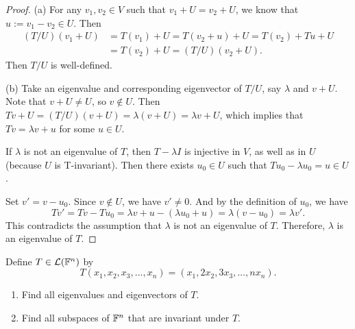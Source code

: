 \documentclass{article}
\begin{document}
\begin{proof}
  (a) For any \( v_1,v_2\in V \) such that \( v_1+U=v_2+U \), we know that \( u:=v_1-v_2\in U \). Then
  \begin{align*}
    (T/U)(v_1+U) &=T(v_1)+U = T(v_2+u)+U = T(v_2)+Tu+U\\
    &= T(v_2)+U = (T/U)(v_2+U).
  \end{align*}
  Then \( T/U \) is well-defined.\par
  (b) Take an eigenvalue and corresponding eigenvector of \( T/U \), say \( \lambda \) and \( v+U \). Note that \( v+U \neq U \), so \( v \notin U \). Then \( Tv+U=(T/U)(v+U)=\lambda(v+U)=\lambda v+U \), which implies that \( Tv=\lambda v+u \) for some \( u\in U \). \par
  If \( \lambda \) is not an eigenvalue of \( T \), then \( T-\lambda I \) is injective in \( V \), as well as in \( U \) (because \( U \) is T-invariant). Then there exists \( u_0\in U \) such that \( Tu_0-\lambda u_0=u\in U \). \par
  Set \( v'=v-u_0 \). Since \( v\notin U \), we have \( v'\neq 0 \). And by the definition of \( u_0 \), we have
  \[ Tv'=Tv-Tu_0=\lambda v+u-(\lambda u_0+u)=\lambda (v-u_0)=\lambda v'. \]
  This contradicts the assumption that \( \lambda \) is not an eigenvalue of \( T \). Therefore, \( \lambda \) is an eigenvalue of \( T \).
\end{proof}



\begin{problem}[5A-42]
Define $T \in \mathcal{L}(\mathbb{F}^n)$ by
\[
T(x_1, x_2, x_3, \ldots, x_n) = (x_1, 2x_2, 3x_3, \ldots, nx_n).
\]
\begin{enumerate}[label=(\alph*)]
	\item Find all eigenvalues and eigenvectors of $T$.
	\item Find all subspaces of $\mathbb{F}^n$ that are invariant under $T$.
\end{enumerate}
\end{problem}
\end{document}
